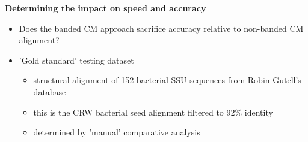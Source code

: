 \documentclass[landscape]{slides}
\begin{document}
\begin{slide}
\begin{center}

\textbf{Determining the impact on speed and accuracy}
\end{center}
\medskip

\small
\begin{itemize}
\item
Does the banded CM approach 
sacrifice accuracy relative to
non-banded CM alignment?
\item
'Gold standard' testing dataset
\begin{itemize}
\item
structural alignment of 152 bacterial SSU sequences
from Robin Gutell's database
\item
this is the CRW bacterial seed alignment filtered to 92\% identity
\item
determined by 'manual' comparative analysis

\end{itemize}
\end{itemize}


\vfill
\end{slide}
\end{document}
